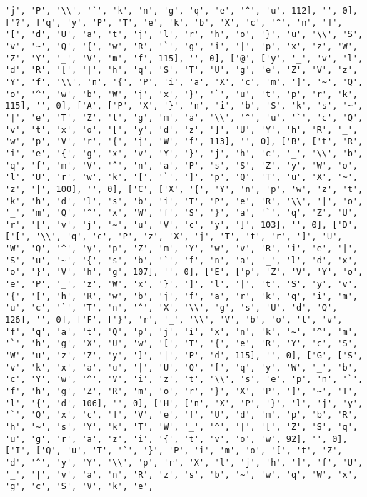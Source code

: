 \documentclass{article}
\begin{document}
\begin{verbatim}
'j', 'P', '\\', '`', 'k', 'n', 'g', 'q', 'e', '^', 'u', 112], '', 0], ['?', ['q', 'y', 'P', 'T', 'e', 'k', 'b', 'X', 'c', '^', 'n', ']', '[', 'd', 'U', 'a', 't', 'j', 'l', 'r', 'h', 'o', '}', 'u', '\\', 'S', 'v', '~', 'Q', '{', 'w', 'R', '`', 'g', 'i', '|', 'p', 'x', 'z', 'W', 'Z', 'Y', '_', 'V', 'm', 'f', 115], '', 0], ['@', ['y', '_', 'v', 'l', 'd', 'R', '[', '|', 'h', 'q', 'S', 'T', 'U', 'g', 'e', 'Z', 'V', 'z', 'Y', 'f', '\\', 'n', '{', 'P', 'i', 'a', 'X', 'c', 'm', ']', '~', 'Q', 'o', '^', 'w', 'b', 'W', 'j', 'x', '}', '`', 'u', 't', 'p', 'r', 'k', 115], '', 0], ['A', ['P', 'X', '}', 'n', 'i', 'b', 'S', 'k', 's', '~', '|', 'e', 'T', 'Z', 'l', 'g', 'm', 'a', '\\', '^', 'u', '`', 'c', 'Q', 'v', 't', 'x', 'o', '[', 'y', 'd', 'z', ']', 'U', 'Y', 'h', 'R', '_', 'w', 'p', 'V', 'r', '{', 'j', 'W', 'f', 113], '', 0], ['B', ['t', 'R', 'i', 'e', '{', 'g', 'x', 'v', 'Y', '}', 'j', 'h', 'c', '_', '\\', 'b', 'q', 'f', 'm', 'V', '^', 'n', 'a', 'P', 's', 'S', 'Z', 'y', 'W', 'o', 'l', 'U', 'r', 'w', 'k', '[', '`', ']', 'p', 'Q', 'T', 'u', 'X', '~', 'z', '|', 100], '', 0], ['C', ['X', '{', 'Y', 'n', 'p', 'w', 'z', 't', 'k', 'h', 'd', 'l', 's', 'b', 'i', 'T', 'P', 'e', 'R', '\\', '|', 'o', '_', 'm', 'Q', '^', 'x', 'W', 'f', 'S', '}', 'a', '`', 'q', 'Z', 'U', 'r', '[', 'v', 'j', '~', 'u', 'V', 'c', 'y', ']', 103], '', 0], ['D', ['[', '\\', 'q', 'c', 'P', 'z', 'X', 'j', 'T', 't', 'r', ']', 'U', 'W', 'Q', '^', 'y', 'p', 'Z', 'm', 'Y', 'w', 'v', 'R', 'i', 'e', '|', 'S', 'u', '~', '{', 's', 'b', '`', 'f', 'n', 'a', '_', 'l', 'd', 'x', 'o', '}', 'V', 'h', 'g', 107], '', 0], ['E', ['p', 'Z', 'V', 'Y', 'o', 'e', 'P', '_', 'z', 'W', 'x', '}', ']', 'l', '|', 't', 'S', 'y', 'v', '{', '[', 'h', 'R', 'w', 'b', 'j', 'f', 'a', 'r', 'k', 'q', 'i', 'm', 'u', 'c', '`', 'T', 'n', '^', 'X', '\\', 'g', 's', 'U', 'd', 'Q', 126], '', 0], ['F', ['}', 'r', '_', '\\', 'V', 'b', 'o', 'l', 'v', 'f', 'q', 'a', 't', 'Q', 'p', 'j', 'i', 'x', 'n', 'k', '~', '^', 'm', '`', 'h', 'g', 'X', 'U', 'w', '[', 'T', '{', 'e', 'R', 'Y', 'c', 'S', 'W', 'u', 'z', 'Z', 'y', ']', '|', 'P', 'd', 115], '', 0], ['G', ['S', 'v', 'k', 'x', 'a', 'u', '|', 'U', 'Q', '[', 'q', 'y', 'W', '_', 'b', 'c', 'Y', 'w', '^', 'V', 'i', 'z', 't', '\\', 's', 'e', 'p', 'n', '`', 'f', 'h', 'g', 'Z', 'R', 'm', 'o', 'r', '}', 'X', 'P', ']', '~', 'T', 'l', '{', 'd', 106], '', 0], ['H', ['n', 'X', 'P', '}', 'l', 'j', 'y', '`', 'Q', 'x', 'c', ']', 'V', 'e', 'f', 'U', 'd', 'm', 'p', 'b', 'R', 'h', '~', 's', 'Y', 'k', 'T', 'W', '_', '^', '|', '[', 'Z', 'S', 'q', 'u', 'g', 'r', 'a', 'z', 'i', '{', 't', 'v', 'o', 'w', 92], '', 0], ['I', ['Q', 'u', 'T', '`', '}', 'P', 'i', 'm', 'o', '[', 't', 'Z', 'd', '^', 'y', 'Y', '\\', 'p', 'r', 'X', 'l', 'j', 'h', ']', 'f', 'U', '_', '|', 'v', 'a', 'n', 'R', 'z', 's', 'b', '~', 'w', 'q', 'W', 'x', 'g', 'c', 'S', 'V', 'k', 'e', 
\end{verbatim}
\end{document}
